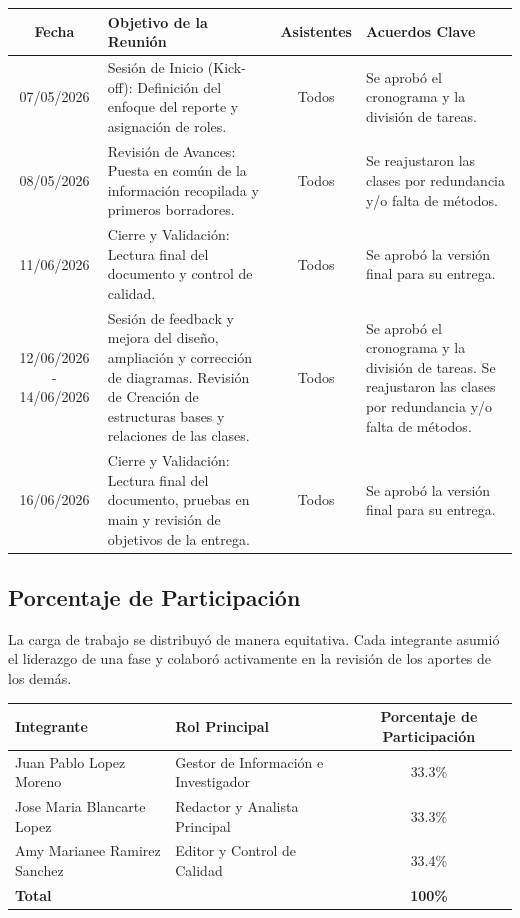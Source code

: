 \documentclass[12pt,a4paper]{article}
\begin{document}
\begin{table}[h!]
    \centering
    \begin{tabularx}{\textwidth}{|c|X|c|X|}
    \hline
    \textbf{Fecha} & \textbf{Objetivo de la Reunión} & \textbf{Asistentes} & \textbf{Acuerdos Clave} \\ \hline
    07/05/2026 & Sesión de Inicio (Kick-off): Definición del enfoque del reporte y asignación de roles. & Todos & Se aprobó el cronograma y la división de tareas. \\ \hline
    08/05/2026 & Revisión de Avances: Puesta en común de la información recopilada y primeros borradores. & Todos & Se reajustaron las clases por redundancia y/o falta de métodos. \\ \hline
    11/06/2026 & Cierre y Validación: Lectura final del documento y control de calidad. & Todos & Se aprobó la versión final para su entrega. \\ \hline
    12/06/2026 - 14/06/2026 & Sesión de feedback y mejora del diseño, ampliación y corrección de diagramas. Revisión de Creación de estructuras bases y relaciones de las clases. & Todos & Se aprobó el cronograma y la división de tareas. Se reajustaron las clases por redundancia y/o falta de métodos. \\ \hline
    16/06/2026 & Cierre y Validación: Lectura final del documento, pruebas en main y revisión de objetivos de la entrega. & Todos & Se aprobó la versión final para su entrega. \\ \hline
    \end{tabularx}
\end{table}

\subsection{Porcentaje de Participación}
La carga de trabajo se distribuyó de manera equitativa. Cada integrante asumió el liderazgo de una fase y colaboró activamente en la revisión de los aportes de los demás.

\begin{table}[ht!]
    \centering
    \small 
    \begin{tabularx}{\textwidth}{|l|X|c|}
    \hline
    \textbf{Integrante} & \textbf{Rol Principal} & \textbf{Porcentaje de Participación} \\ \hline
    Juan Pablo Lopez Moreno & Gestor de Información e Investigador & 33.3\% \\ \hline
    Jose Maria Blancarte Lopez & Redactor y Analista Principal & 33.3\% \\ \hline
    Amy Marianee Ramirez Sanchez & Editor y Control de Calidad & 33.4\% \\ \hline
    \textbf{Total} & & \textbf{100\%} \\ \hline
    \end{tabularx}
\end{table}
\end{document}
